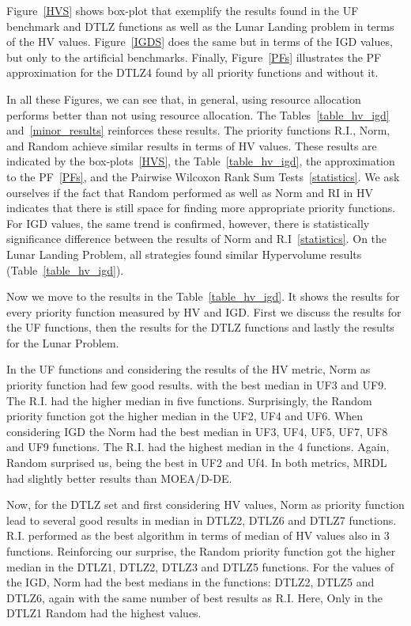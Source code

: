 Figure~\ref{HVS} shows box-plot that exemplify the results found in the UF benchmark and DTLZ functions as well as the Lunar Landing problem in terms of the HV values. Figure~\ref{IGDS} does the same but in terms of the IGD values, but only to the artificial benchmarks. Finally, Figure~\ref{PFs} illustrates the PF approximation for the DTLZ4 found by all priority functions and without it.

In all these Figures, we can see that, in general, using resource allocation performs better than not using resource allocation. The Tables~\ref{table_hv_igd} and~\ref{minor_results} reinforces these results. The priority functions R.I., Norm, and Random achieve similar results in terms of HV values. These results are indicated by the box-plots~\ref{HVS}, the Table~\ref{table_hv_igd}, the approximation to the PF~\ref{PFs}, and the Pairwise Wilcoxon Rank Sum Tests~\ref{statistics}. We ask ourselves if the fact that Random performed as well as Norm and RI in HV indicates that there is still space for finding more appropriate priority functions. For IGD values, the same trend is confirmed, however, there is statistically significance difference between the results of Norm and R.I~\ref{statistics}. On the Lunar Landing Problem, all strategies found similar Hypervolume results (Table~\ref{table_hv_igd}). 

Now we move to the results in the Table~\ref{table_hv_igd}. It shows the results for every priority function measured by HV and IGD.  First we discuss the results for the UF functions, then the results for the DTLZ functions and lastly the results for the Lunar Problem. 

In the UF functions and considering the results of the HV metric, Norm as priority function had few good results. with the best median in UF3 and UF9. The R.I. had the higher median in five functions. Surprisingly, the Random priority function got the higher median in the UF2, UF4 and UF6. When considering IGD the Norm had the best median in UF3, UF4, UF5, UF7, UF8 and UF9 functions. The R.I. had the highest median in the 4 functions. Again, Random surprised us, being the best in UF2 and Uf4. In both metrics, MRDL had slightly better results than MOEA/D-DE.

Now, for the DTLZ set and first considering HV values, Norm as priority function lead to several good results in median in DTLZ2, DTLZ6 and DTLZ7 functions. R.I. performed as the best algorithm in terms of median of HV values also in 3 functions. Reinforcing our surprise, the Random priority function got the higher median in the DTLZ1, DTLZ2, DTLZ3 and DTLZ5 functions. For the values of the IGD, Norm had the best medians in the functions: DTLZ2, DTLZ5 and DTLZ6, again with the same number of best results as R.I. Here, Only in the DTLZ1 Random had the highest values.

